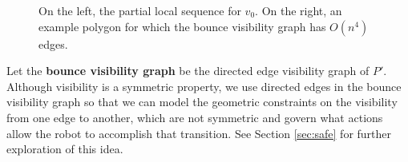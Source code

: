 \documentclass[]{article}
\begin{document}
\begin{figure}[h]
\begin{subfigure}{0.4\textwidth}
\end{subfigure}
\centering
\caption{On the left, the partial local sequence for $v_0$. On the right, an example polygon for which the bounce visibility graph has
$O(n^4)$ edges.\label{fig:alg1}}
\end{figure}

Let the \textbf{bounce visibility graph} be the directed edge visibility graph of
$P'$. Although visibility is a symmetric property, we use directed edges in the
bounce visibility graph so that 
we can model the 
geometric constraints on the visibility from one edge to another, which are
not symmetric and govern what actions allow the robot to accomplish that
transition. See Section \ref{sec:safe} for further exploration of this idea.

%
%
\end{document}

